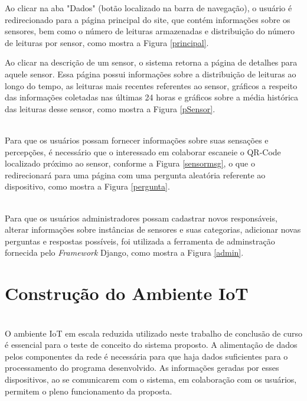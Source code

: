 \newpage
\null \quad Ao clicar na aba "Dados"  (botão localizado na barra de navegação), o usuário é redirecionado para a página principal do site, que contém informações sobre os sensores, bem como o número de leituras armazenadas e distribuição do número de leituras por sensor, como mostra a Figura \ref{principal}.

\newpage
\null \quad Ao clicar na descrição de um sensor, o sistema retorna a página de detalhes para aquele sensor. Essa página possui informações sobre a distribuição de leituras ao longo do tempo, as leituras mais recentes referentes ao sensor, gráficos a respeito das informações coletadas nas últimas 24 horas e gráficos sobre a média histórica das leituras desse sensor, como mostra a Figura \ref{pSensor}.
\newpage
{}


\\\null \quad Para que os usuários possam fornecer informações sobre suas sensações e percepções, é necessário que o interessado em colaborar escaneie o QR-Code localizado próximo ao sensor, conforme a Figura \ref{sensormsg}, o que o redirecionará para uma página com uma pergunta aleatória referente ao dispositivo, como mostra a Figura \ref{pergunta}.


\\\null \quad Para que os usuários administradores possam cadastrar novos responsáveis, alterar informações sobre instâncias de sensores e suas categorias, adicionar novas perguntas e respostas possíveis, foi utilizada a ferramenta de adminstração fornecida pelo \textit{Framework} Django, como mostra a Figura \ref{admin}.



\section{Construção do Ambiente IoT}
\label{sec:ambiente}
\\\null \quad O ambiente \acrshort{IoT} em escala reduzida utilizado neste trabalho de conclusão de curso é essencial para o teste de conceito
do sistema proposto. A alimentação de dados pelos componentes da rede é necessária para que haja
dados suficientes para o processamento do programa desenvolvido. As informações geradas por esses dispositivos, ao se comunicarem com o sistema, em colaboração
com os usuários, permitem o pleno funcionamento da proposta.

